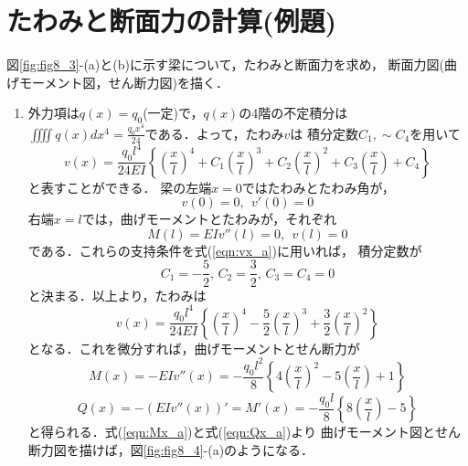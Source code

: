 \documentclass[10pt,a4j]{jbook}
\begin{document}
\section{たわみと断面力の計算(例題)}
図\ref{fig:fig8_3}-(a)と(b)に示す梁について，たわみと断面力を求め，
断面力図(曲げモーメント図，せん断力図)を描く．
\renewcommand{\labelenumi}{(\alph{enumi})}
\begin{enumerate}
\item
外力項は$q(x)=q_0$(一定)で，$q(x)$の4階の不定積分は
$\iiiint q(x)dx^4=\frac{q_0x^4}{24}$である．よって，たわみ$v$は
積分定数$C_1,\sim C_4$を用いて
\begin{equation}
	v(x)= \frac{q_0l^4}{24EI}\left\{
		\left(\frac{x}{l}\right)^4
		+
		C_1
		\left(\frac{x}{l}\right)^3
		+
		C_2
		\left(\frac{x}{l}\right)^2
		+
		C_3
		\left(\frac{x}{l}\right)
		+
		C_4
	\right\}
	\label{eqn:vx_a}
\end{equation}
と表すことができる．
梁の左端$x=0$ではたわみとたわみ角が，
\begin{equation}
	v(0)=0, \ \ v'(0)=0
	\label{eqn:bcon_al}
\end{equation}
右端$x=l$では，曲げモーメントとたわみが，それぞれ
\begin{equation}
	M(l)=EIv''(l)=0, \ \ v(l)=0
	\label{eqn:bcon_al}
\end{equation}
である．これらの支持条件を式(\ref{eqn:vx_a})に用いれば，
積分定数が
\begin{equation}
	C_1=-\frac{5}{2}, \, 
	C_2=\frac{3}{2}, \,
	C_3=C_4=0
	\label{eqn:int_cnst}
\end{equation}
と決まる．以上より，たわみは
\begin{equation}
	v(x)= \frac{q_0l^4}{24EI}\left\{
		\left(\frac{x}{l}\right)^4
		-
		\frac{5}{2}
		\left(\frac{x}{l}\right)^3
		+
		\frac{3}{2}
		\left(\frac{x}{l}\right)^2
	\right\}
	\label{eqn:vx_a_sol}
\end{equation}
となる．これを微分すれば，曲げモーメントとせん断力が
\begin{equation}
	M(x)= 
	-EIv''(x)
	=
	-\frac{q_0l^2}{8}\left\{
		4
		\left(\frac{x}{l}\right)^2
		-
		5
		\left(\frac{x}{l}\right)
		+
		1
	\right\}
	\label{eqn:Mx_a}
\end{equation}
\begin{equation}
	Q(x)= 
	-\left(EIv''(x)\right)'
	= M'(x)
	=
	-\frac{q_0l}{8}\left\{
		8
		\left(\frac{x}{l}\right)
		-
		5
	\right\}
	\label{eqn:Qx_a}
\end{equation}
と得られる．式(\ref{eqn:Mx_a})と式(\ref{eqn:Qx_a})より
曲げモーメント図とせん断力図を描けば，図\ref{fig:fig8_4}-(a)のようになる．

\end{enumerate}
\end{document}
